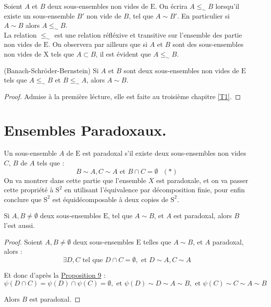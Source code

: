 \noindent
Soient $A$ et $B$ deux sous-ensembles non vides de $\mathrm{E}$. On écrira $A \le_\sim B$ lorsqu'il existe un sous-ensemble $B'$ non vide de $B$, tel que $A \sim B'$. En particulier si $A \sim B$ alors $A \le_\sim B$.\\
La relation $\le_\sim$ est une relation réfléxive et transitive sur l'ensemble des partie non vides de $\mathrm{E}$. On observera par ailleurs que si $A$ et $B$ sont des sous-ensembles non vides de $\mathrm{X}$ tels que $A \subset B$, il est évident que $A \le_\sim B$.\par
\begin{theorem}(Banach-Schröder-Bernstein)
  Si $A$ et $B$ sont deux sous-ensembles non vides de $\mathrm{E}$ tels que $A \le_\sim B$ et $B \le_\sim A$, alors $A \sim B$.\par
  \label{theorem1}
\end{theorem}
\begin{proof}
  Admise à la première lécture, elle est faite au troisième chapitre \ref{T1}.
\end{proof}
\section{Ensembles Paradoxaux.}
\noindent
Un sous-ensemble $A$ de $\mathrm{E}$ est paradoxal s'il existe deux sous-ensembles non vides $C$, $B$ de $A$ tels que :
$$B \sim A, C \sim A \text{ et } B \cap C=\emptyset \text{ $(*)$}$$
On va montrer dans cette partie que l'ensemble $X$ est paradoxale, et on va passer cette propriété à $\mathrm{S}^2$ en utilisant l'équivalence par décomposition finie, pour enfin conclure que $\mathrm{S}^2$ est équidécomposable à deux copies de $\mathrm{S}^2$.
\begin{prop}\label{prop11}
  \hfill

  Si $A, B \ne \emptyset$ deux sous-ensembles $\mathrm{E}$, tel que $A \sim B$, et $A$ est paradoxal, alors $B$ l'est aussi.
\end{prop}
\begin{proof}
  \hfill

  Soient $A, B \ne \emptyset$ deux sous-ensembles $\mathrm{E}$ telles que $A \sim B$, et $A$ paradoxal, alors :$$\exists D, C \text{ tel que } D\cap C =\emptyset, \text{ et } D\sim A, C\sim A$$\par
  Et donc d'après la \hyperref[prop10]{Proposition 9} : $$\psi(D\cap C) = \psi(D)\cap \psi(C)= \emptyset, \text{ et } \psi(D)\sim D \sim A \sim B, \text{ et }  \psi(C)\sim C \sim A \sim B$$\par
  Alors $B$ est paradoxal.\par
\end{proof}

